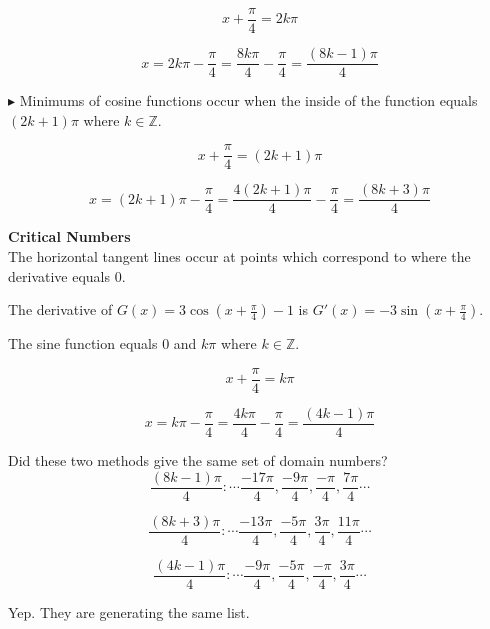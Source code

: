 \documentclass{ximera}
\begin{document}
\begin{example}
\begin{explanation}
\[
x + \frac{\pi}{4} = 2 k \pi
\]

\[
x = 2 k \pi - \frac{\pi}{4} = \frac{8 k \pi}{4} - \frac{\pi}{4} = \frac{(8k - 1)\pi}{4}
\]




$\blacktriangleright$ Minimums of cosine functions occur when the inside of the function equals $(2 k + 1) \pi$ where $k \in \mathbb{Z}$.


\[
x + \frac{\pi}{4} = (2 k + 1) \pi
\]

\[
x = (2 k + 1) \pi - \frac{\pi}{4} = \frac{4(2 k + 1) \pi}{4} - \frac{\pi}{4} = \frac{(8k + 3)\pi}{4}
\]


\end{explanation}








\begin{explanation} \textbf{\textcolor{blue!55!black}{Critical Numbers}} \\


The horizontal tangent lines occur at points which correspond to where the derivative equals $0$.  






The derivative of $G(x) = 3 \cos\left( x + \frac{\pi}{4} \right) - 1$ is $G'(x) = -3 \sin\left( x + \frac{\pi}{4} \right)$.


The sine function equals $0$ and $k \pi$ where $k \in \mathbb{Z}$.



\[
x + \frac{\pi}{4} =  k \pi
\]


\[
x  =    k \pi - \frac{\pi}{4} =  \frac{4 k \pi}{4} - \frac{\pi}{4} = \frac{(4k - 1)\pi}{4}
\]









\end{explanation}



Did these two methods give the same set of domain numbers? \\



\[
\frac{(8k - 1)\pi}{4} :  \cdots \frac{-17\pi}{4}, \frac{-9\pi}{4}, \frac{-\pi}{4}, \frac{7\pi}{4} \cdots
\]

\[
\frac{(8k + 3)\pi}{4} :  \cdots \frac{-13\pi}{4}, \frac{-5\pi}{4}, \frac{3\pi}{4}, \frac{11\pi}{4} \cdots
\]


\[
\frac{(4k - 1)\pi}{4} :  \cdots \frac{-9\pi}{4}, \frac{-5\pi}{4}, \frac{-\pi}{4}, \frac{3\pi}{4} \cdots
\]



Yep.  They are generating the same list.


\end{example}
\end{document}
